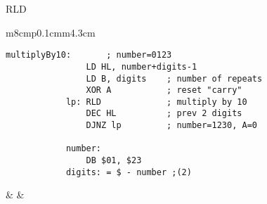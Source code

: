 \begin{basedescript}{
    \desclabelstyle{\multilinelabel}
    \desclabelwidth{3cm}}
\begin{DetailItem}{RLD}
        \begin{tabular}{m{8cm}p{0.1cm}m{4.3cm}}

            \begin{lstlisting}[autogobble=true]
            multiplyBy10:		; number=0123
                LD HL, number+digits-1
                LD B, digits	; number of repeats
                XOR A			; reset "carry"
            lp:	RLD				; multiply by 10 
                DEC HL			; prev 2 digits
                DJNZ lp			; number=1230, A=0

            number:
                DB $01, $23
            digits: = $ - number ;(2)
            \end{lstlisting}
	
            & &
   	
            \newcommand{\HLindicator}[2]{
                \path (progress-#1-2.south west) --
                    node[xshift=#2, yshift=1.4ex, rotate=90]{$\lbrace$}
                    node[xshift=#2 + 0.1ex, yshift=0.2ex, indicator]{(HL)} (progress-#1-2.south)
            }
	
            \newcommand{\ByteIndicator}[1]{
                \draw 
                    (progress-#1-2.west) ++(8.5pt,9pt) 
                    |- ++(5pt,-3pt) -| ++(6pt,3pt) 
                    ++(1pt,0) 
                    |- ++(5pt,-3pt) -| ++(6pt,3pt);
            }
	
\end{tabular}
\end{DetailItem}
\end{basedescript}
